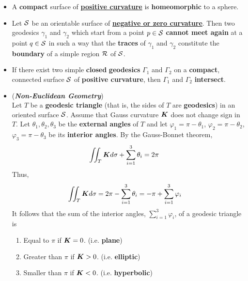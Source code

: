 \documentclass[11pt]{article}
\begin{document}
\begin{itemize}
\item \begin{proposition} 
A \textbf{compact} surface of \underline{\textbf{positive curvature}} is \textbf{homeomorphic} to a sphere.
\end{proposition}

\item \begin{proposition}
Let ${\mathcal S}$ be an orientable surface of \underline{\textbf{negative or zero curvature}}. Then two geodesics $\gamma_1$ and $\gamma_2$ which start from a point $p \in {\mathcal S}$ \textbf{cannot meet again} at a point $q \in {\mathcal S}$ in such a way that the \textbf{traces} of $\gamma_1$ and $\gamma_2$ constitute the \textbf{boundary} of a simple region ${\mathcal R}$ of ${\mathcal S}$.
\end{proposition}

\item \begin{proposition}
If there exist two simple \textbf{closed} \textbf{geodesics} $\Gamma_1$ and $\Gamma_2$ on a \textbf{compact}, connected surface ${\mathcal S}$ of \textbf{positive curvature}, then $\Gamma_1$ and $\Gamma_2$  \textbf{intersect}.
\end{proposition}

\item \begin{remark} (\textbf{\emph{Non-Euclidean Geometry}})\\
Let $T$ be a \textbf{geodesic triangle} (that is, the sides of $T$ are \textbf{geodesics}) in an oriented surface ${\mathcal S}$. Assume that Gauss curvature $\boldsymbol{K}$ does not change sign in $T$. Let $\theta_1, \theta_2, \theta_3$ be the \textbf{external angles} of $T$ and let $\varphi_1 = \pi - \theta_1$,  $\varphi_2 = \pi - \theta_2$,  $\varphi_3 = \pi - \theta_3$ be its \textbf{interior angles}. By the Gauss-Bonnet theorem,
\begin{align*}
\iint_{T}\boldsymbol{K}d\sigma + \sum_{i=1}^{3}\theta_i &= 2\pi\,
\end{align*}
Thus,
\begin{align}
\iint_{T}\boldsymbol{K}d\sigma &= 2\pi- \sum_{i=1}^{3}\theta_i = -\pi + \sum_{i=1}^{3}\varphi_{i} \label{eqn: non_euclidean_sum_interior_angles}
\end{align}
It follows that the sum of the interior angles, $\sum_{i=1}^{3}\varphi_{i}$, of a geodesic triangle is
\begin{enumerate}
\item Equal to $\pi$ if $\boldsymbol{K} = 0$. (i.e. \textbf{plane})
\item Greater than $\pi$ if $\boldsymbol{K} > 0$. (i.e. \textbf{elliptic}) 
\item Smaller than $\pi$ if $\boldsymbol{K} < 0$. (i.e. \textbf{hyperbolic}) 
\end{enumerate}


\end{remark}
\end{itemize}
\end{document}
